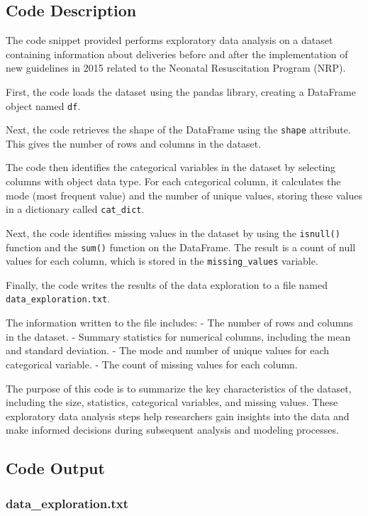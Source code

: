 \documentclass[11pt]{article}
\begin{document}
\subsection{Code Description}

The code snippet provided performs exploratory data analysis on a dataset containing information about deliveries before and after the implementation of new guidelines in 2015 related to the Neonatal Resuscitation Program (NRP). 

First, the code loads the dataset using the pandas library, creating a DataFrame object named \texttt{df}. 

Next, the code retrieves the shape of the DataFrame using the \texttt{shape} attribute. This gives the number of rows and columns in the dataset.

The code then identifies the categorical variables in the dataset by selecting columns with object data type. For each categorical column, it calculates the mode (most frequent value) and the number of unique values, storing these values in a dictionary called \texttt{cat\_dict}.

Next, the code identifies missing values in the dataset by using the \texttt{isnull()} function and the \texttt{sum()} function on the DataFrame. The result is a count of null values for each column, which is stored in the \texttt{missing\_values} variable.

Finally, the code writes the results of the data exploration to a file named \texttt{data\_exploration.txt}. 

The information written to the file includes:
- The number of rows and columns in the dataset.
- Summary statistics for numerical columns, including the mean and standard deviation.
- The mode and number of unique values for each categorical variable.
- The count of missing values for each column.

The purpose of this code is to summarize the key characteristics of the dataset, including the size, statistics, categorical variables, and missing values. These exploratory data analysis steps help researchers gain insights into the data and make informed decisions during subsequent analysis and modeling processes.

\subsection{Code Output}

\subsubsection*{data\_exploration.txt}
\end{document}
